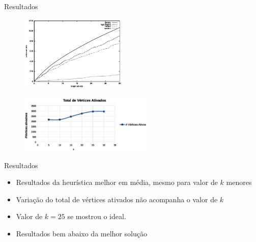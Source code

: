 \documentclass[t,14pt,mathserif,xcolor=table]{beamer}
\begin{document}
\begin{frame}{Resultados}

\begin{figure}[!t]
	\centering
	\includegraphics[width=2.0in]{../img/grafico_baseline.eps}
	\label{fig_vertex_cover}
	
\end{figure}


\begin{figure}[!t]
	\centering
	\includegraphics[width=2.5in]{../img/grafico_total.eps}
	\label{fig_vertex_cover}

\end{figure}


\end{frame}

\begin{frame}{Resultados}

	\begin{itemize}
		
		\item Resultados da heurística melhor em média, mesmo para valor de $k$ menores
		\item Variação do total de vértices ativados não acompanha o valor de $k$
		\item Valor de $k= 25$ se mostrou o ideal.
		\item Resultados bem abaixo da melhor solução \cite{Hochbaum:1996:ACP:241938.241941} 		
		
	\end{itemize}	


\end{frame}

\end{document}
